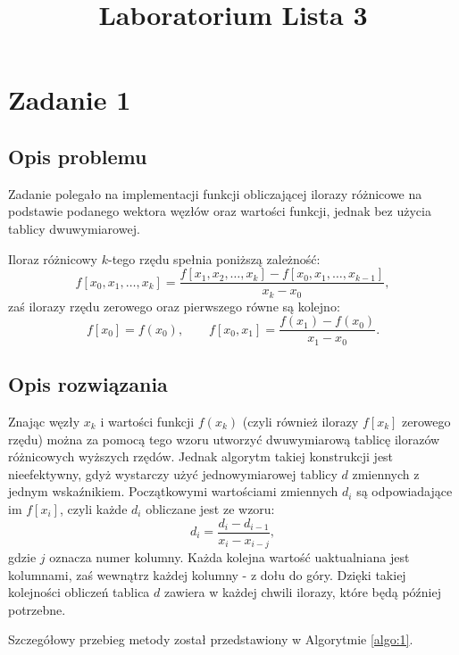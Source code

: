 \documentclass{classrep}
\author{
  \studentinfo{Agata Jasionowska}{229726}
}
\title{Laboratorium \ppauza Lista 3}
\begin{document}
\maketitle

\section{Zadanie 1}
	\subsection{Opis problemu}
		Zadanie polegało na implementacji funkcji obliczającej ilorazy różnicowe na podstawie podanego wektora węzłów oraz wartości funkcji, jednak bez użycia tablicy dwuwymiarowej.
		
		Iloraz różnicowy $k$-tego rzędu spełnia poniższą zależność:
		$$f[x_0,x_1, \ldots, x_k] = \frac{f[x_1,x_2, \ldots, x_k] - f[x_0, x_1, \ldots, x_{k-1}]}{x_k - x_0},$$
		zaś ilorazy rzędu zerowego oraz pierwszego równe są kolejno:
		$$f[x_0] = f(x_0), \qquad f[x_0,x_1] = \frac{f(x_1) - f(x_0)}{x_1 - x_0}.$$
		
	
	\subsection{Opis rozwiązania}
		Znając węzły $x_k$ i wartości funkcji $f(x_k)$ (czyli również ilorazy $f[x_k]$ zerowego rzędu) można za pomocą tego wzoru utworzyć dwuwymiarową tablicę ilorazów różnicowych wyższych rzędów. Jednak algorytm takiej konstrukcji jest nieefektywny, gdyż wystarczy użyć jednowymiarowej tablicy $d$ zmiennych z jednym wskaźnikiem. Początkowymi wartościami zmiennych $d_i$ są odpowiadające im $f[x_i]$, czyli każde $d_i$ obliczane jest ze wzoru:
		$$d_i = \frac{d_i-d_{i-1}}{x_i-x_{i-j}}, $$	
		gdzie $j$ oznacza numer kolumny.	
		Każda kolejna wartość uaktualniana jest kolumnami, zaś wewnątrz każdej kolumny - z dołu do góry. Dzięki takiej kolejności obliczeń tablica $d$ zawiera w każdej chwili ilorazy, które będą później potrzebne. 
		
		Szczegółowy przebieg metody został przedstawiony w Algorytmie \ref{algo:1}.
		
\end{document}
